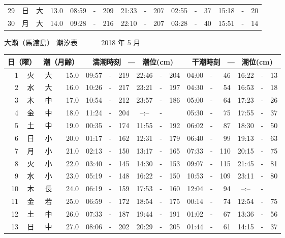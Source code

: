 \documentclass[12pt.a4j]{jsarticle}
\begin{document}
\begin{center}
\begin{table}[ht]
\begin{tabular}{|rc|cr|ccrccr|ccrccr|}
29 & 日 & 大 & 13.0 &  08:59 &-& 209  &  21:33 &-& 207  &   02:55 &-&  37  &   15:18 &-&  20  \\
30 & 月 & 大 & 14.0 &  09:28 &-& 216  &  22:10 &-& 207  &   03:28 &-&  40  &   15:51 &-&  14  \\
   \hline
   \end{tabular}
\end{table}
\newpage
 {\LARGE 大瀬（馬渡島）  潮汐表　　　}
 {\large 2018 年  5 月}\\
 \begin{table}[ht]
    \begin{tabular}{|rc|cr|ccrccr|ccrccr|}
    \hline
    \multicolumn{2}{|c|}{日（曜）} & \multicolumn{2}{c|}{潮（月齢）} & \multicolumn{6}{c|}{満潮時刻　―　潮位(cm)} & \multicolumn{6}{c|}{干潮時刻　―　潮位(cm)} \\
 \hline
 1 & 火 & 大 & 15.0 &  09:57 &-& 219  &  22:46 &-& 204  &   04:00 &-&  46  &   16:22 &-&  13  \\
 2 & 水 & 大 & 16.0 &  10:26 &-& 217  &  23:21 &-& 197  &   04:30 &-&  54  &   16:53 &-&  18  \\
 3 & 木 & 中 & 17.0 &  10:54 &-& 212  &  23:57 &-& 186  &   05:00 &-&  64  &   17:23 &-&  26  \\
 4 & 金 & 中 & 18.0 &  11:24 &-& 204  &  --:-- &-&     &   05:30 &-&  75  &   17:55 &-&  37  \\
 5 & 土 & 中 & 19.0 &  00:35 &-& 174  &  11:55 &-& 192  &   06:02 &-&  87  &   18:30 &-&  50  \\
 6 & 日 & 小 & 20.0 &  01:17 &-& 162  &  12:31 &-& 179  &   06:40 &-&  99  &   19:13 &-&  63  \\
 7 & 月 & 小 & 21.0 &  02:13 &-& 150  &  13:17 &-& 165  &   07:33 &-& 110  &   20:15 &-&  75  \\
 8 & 火 & 小 & 22.0 &  03:40 &-& 145  &  14:30 &-& 153  &   09:07 &-& 115  &   21:45 &-&  81  \\
 9 & 水 & 小 & 23.0 &  05:19 &-& 148  &  16:22 &-& 150  &   10:53 &-& 109  &   23:11 &-&  80  \\
10 & 木 & 長 & 24.0 &  06:19 &-& 159  &  17:53 &-& 160  &   12:04 &-&  94  &   --:-- &-&     \\
11 & 金 & 若 & 25.0 &  06:59 &-& 172  &  18:54 &-& 175  &   00:14 &-&  74  &   12:54 &-&  75  \\
12 & 土 & 中 & 26.0 &  07:33 &-& 187  &  19:44 &-& 191  &   01:02 &-&  67  &   13:36 &-&  56  \\
13 & 日 & 中 & 27.0 &  08:06 &-& 202  &  20:29 &-& 205  &   01:44 &-&  61  &   14:15 &-&  37  \\

\end{tabular}
\end{table}
\end{center}
\end{document}
